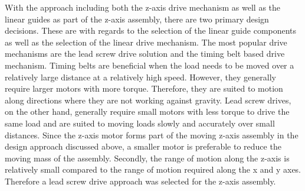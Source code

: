 With the approach including both the z-axis drive mechanism as well as the linear guides as part of the z-axis assembly, there are two primary design decisions. These are with regards to the selection of the linear guide components as well as the selection of the linear drive mechanism. The most popular drive mechanisms are the lead screw drive solution and the timing belt based drive mechanism. Timing belts are beneficial when the load needs to be moved over a relatively large distance at a relatively high speed. However, they generally require larger motors with more torque. Therefore, they are suited to motion along directions where they are not working against gravity. Lead screw drives, on the other hand, generally require small motors with less torque to drive the same load and are suited to moving loads slowly and accurately over small distances. Since the z-axis motor forms part of the moving z-axis assembly in the design approach discussed above, a smaller motor is preferable to reduce the moving mass of the assembly. Secondly, the range of motion along the z-axis is relatively small compared to the range of motion required along the x and y axes. Therefore a lead screw drive approach was selected for the z-axis assembly.

